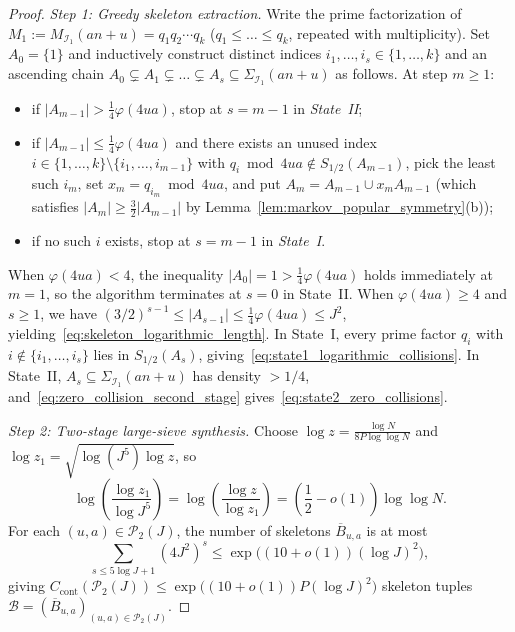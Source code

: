 \documentclass[11pt, a4paper]{article}
\theoremstyle{plain}
\theoremstyle{definition}
\begin{document}
\begin{proof}
\emph{Step 1: Greedy skeleton extraction.}
Write the prime factorization of $M_1:=M_{\mathcal{I}_1}(an+u)=q_1 q_2\cdots q_k$ ($q_1\le\dots\le q_k$, repeated with multiplicity). Set $A_0=\{1\}$ and inductively construct distinct indices $i_1,\dots,i_s\in\{1,\dots,k\}$ and an ascending chain $A_0\subsetneq A_1\subsetneq\dots\subsetneq A_s\subseteq\Sigma_{\mathcal{I}_1}(an+u)$ as follows. At step $m\ge1$:
\begin{itemize}
    \item if $|A_{m-1}|>\frac14\varphi(4ua)$, stop at $s=m-1$ in \emph{State~II};
    \item if $|A_{m-1}|\le\frac14\varphi(4ua)$ and there exists an unused index $i\in\{1,\dots,k\}\setminus\{i_1,\dots,i_{m-1}\}$ with $q_i\bmod 4ua\notin S_{1/2}(A_{m-1})$, pick the least such $i_m$, set $x_m=q_{i_m}\bmod 4ua$, and put $A_m=A_{m-1}\cup x_m A_{m-1}$ (which satisfies $|A_m|\ge\frac32|A_{m-1}|$ by Lemma~\ref{lem:markov_popular_symmetry}(b));
    \item if no such $i$ exists, stop at $s=m-1$ in \emph{State~I}.
\end{itemize}
When $\varphi(4ua)<4$, the inequality $|A_0|=1>\frac14\varphi(4ua)$ holds immediately at $m=1$, so the algorithm terminates at $s=0$ in State~II. When $\varphi(4ua)\ge 4$ and $s\ge 1$, we have $(3/2)^{s-1}\le\allowbreak|A_{s-1}|\le\allowbreak\frac14\varphi(4ua)\le J^{2}$, yielding~\eqref{eq:skeleton_logarithmic_length}. In State~I, every prime factor $q_i$ with $i\notin\allowbreak\{i_1,\dots,i_s\}$ lies in $S_{1/2}(A_s)$, giving~\eqref{eq:state1_logarithmic_collisions}. In State~II, $A_s\subseteq\Sigma_{\mathcal{I}_1}(an+u)$ has density $>1/4$, and~\eqref{eq:zero_collision_second_stage} gives~\eqref{eq:state2_zero_collisions}.

\medskip\noindent\emph{Step 2: Two-stage large-sieve synthesis.}
Choose $\log z=\frac{\log N}{8P\log\log N}$ and $\log z_1=\sqrt{\log(J^{5})\log z}$, so 
\[
\log\left(\frac{\log z_1}{\log J^{5}}\right)=\log\left(\frac{\log z}{\log z_1}\right)=\left(\frac12-o(1)\right)\log\log N.
\]
For each $(u,a)\in\mathcal{P}_2(J)$, the number of skeletons $\overline{B}_{u,a}$ is at most 
\[
\sum_{s\le 5\log J+1}(4J^{2})^{s}\le\exp\big((10+o(1))(\log J)^{2}\big),
\]
giving $C_{\mathrm{cont}}(\mathcal{P}_2(J))\le\exp\big((10+o(1))P(\log J)^{2}\big)$ skeleton tuples $\mathcal{B}=(\overline{B}_{u,a})_{(u,a)\in\mathcal{P}_2(J)}$. 


\end{proof}
\end{document}
